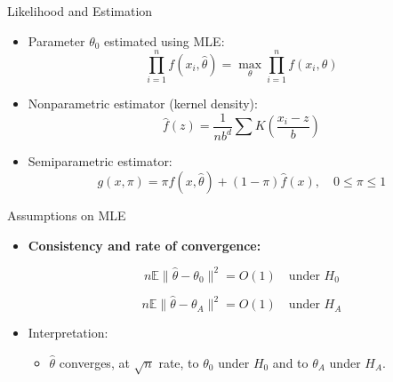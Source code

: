 
\begin{frame}{Likelihood and Estimation}
\begin{itemize}
    \item Parameter $\theta_0$ estimated using MLE:
    \[
    \prod_{i=1}^n f(x_i,\hat\theta) = \max_{\theta} \prod_{i=1}^n f(x_i,\theta)
    \]

    \item Nonparametric estimator (kernel density):
    \[
    \hat{f}(z) = \frac{1}{n b^d} \sum K\left(\frac{x_i - z}{b}\right)
   \]

    \item Semiparametric estimator:
    \[
    g(x,\pi) = \pi f(x,\hat\theta) + (1-\pi)\hat{f}(x), \quad 0 \leq \pi \leq 1
    \]
\end{itemize}
\end{frame}


\begin{frame}{Assumptions on MLE}
\begin{itemize}
    \item \textbf{Consistency and rate of convergence:}

    \[
    n \mathbb{E}\|\hat{\theta} - \theta_0\|^2 = O(1) \quad \text{under } H_0
    \]

    \[
    n \mathbb{E}\|\hat{\theta} - \theta_A\|^2 = O(1) \quad \text{under } H_A
    \]

    \item Interpretation:
    \begin{itemize}
        \item $\hat{\theta}$ converges, at $\sqrt{n}$ rate, to $\theta_0$ under $H_0$ and to $\theta_A$ under $H_A$.
    \end{itemize}
\end{itemize}
\end{frame}


